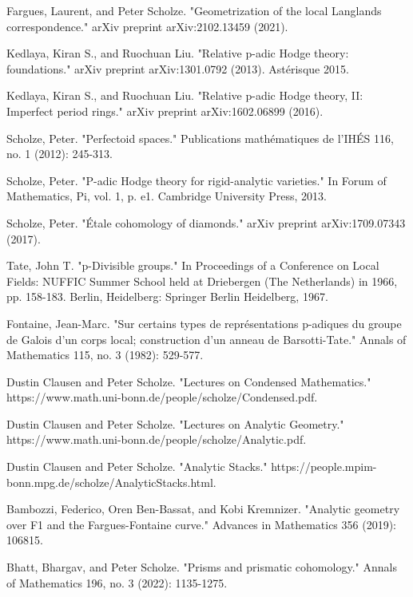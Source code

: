 \documentclass[12pt]{article}
\theoremstyle{definition}
\begin{document}
\begin{thebibliography}{}
 
 Fargues, Laurent, and Peter Scholze. "Geometrization of the local Langlands correspondence." arXiv preprint arXiv:2102.13459 (2021).

 Kedlaya, Kiran S., and Ruochuan Liu. "Relative p-adic Hodge theory: foundations." arXiv preprint arXiv:1301.0792 (2013). Ast\'erisque 2015.

 Kedlaya, Kiran S., and Ruochuan Liu. "Relative p-adic Hodge theory, II: Imperfect period rings." arXiv preprint arXiv:1602.06899 (2016).

 Scholze, Peter. "Perfectoid spaces." Publications math\'ematiques de l'IH\'ES 116, no. 1 (2012): 245-313.

 Scholze, Peter. "P-adic Hodge theory for rigid-analytic varieties." In Forum of Mathematics, Pi, vol. 1, p. e1. Cambridge University Press, 2013.

 Scholze, Peter. "\'Etale cohomology of diamonds." arXiv preprint arXiv:1709.07343 (2017).

 Tate, John T. "p-Divisible groups." In Proceedings of a Conference on Local Fields: NUFFIC Summer School held at Driebergen (The Netherlands) in 1966, pp. 158-183. Berlin, Heidelberg: Springer Berlin Heidelberg, 1967.

 Fontaine, Jean-Marc. "Sur certains types de repr\'esentations p-adiques du groupe de Galois d'un corps local; construction d'un anneau de Barsotti-Tate." Annals of Mathematics 115, no. 3 (1982): 529-577.

 Dustin Clausen and Peter Scholze. "Lectures on Condensed Mathematics." https://www.math.uni-bonn.de/people/scholze/Condensed.pdf.

 Dustin Clausen and Peter Scholze. "Lectures on Analytic Geometry." https://www.math.uni-bonn.de/people/scholze/Analytic.pdf.

 Dustin Clausen and Peter Scholze. "Analytic Stacks." https://people.mpim-bonn.mpg.de/scholze/AnalyticStacks.html.

 Bambozzi, Federico, Oren Ben-Bassat, and Kobi Kremnizer. "Analytic geometry over F1 and the Fargues-Fontaine curve." Advances in Mathematics 356 (2019): 106815.

 Bhatt, Bhargav, and Peter Scholze. "Prisms and prismatic cohomology." Annals of Mathematics 196, no. 3 (2022): 1135-1275.


\end{thebibliography}
\end{document}
